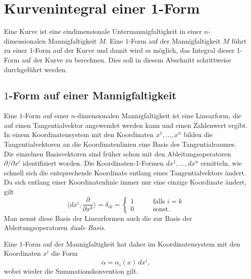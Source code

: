%
%
\section{Kurvenintegral einer 1-Form
\label{buch:kurvenintegral:section:1form}}
%
Eine Kurve ist eine eindimensionale Untermannigfaltigkeit in
einer $n$-dimensionalen Mannigfaltigkeit $M$.
Eine $1$-Form auf der Mannigfaltigkeit $M$ führt zu einer 
$1$-Form auf der Kurve und damit wird es möglich, das Integral
dieser 1-Form auf der Kurve zu berechnen.
Dies soll in diesem Abschnitt schrittweise durchgeführt werden.

%
%
\subsection{$1$-Form auf einer Mannigfaltigkeit}
Eine $1$-Form auf einer $n$-dimensionalen Mannigfaltigkeit ist eine
Linearform, die auf einen Tangentialvektor angewendet werden kann
und einen Zahlenwert ergibt.
In einem Koordinatensystem mit den Koordinaten $x^1,\dots,x^n$ bilden
die Tangentialvektoren an die Koordinatenlinien eine Basis des
Tangentialraumes.
Die einzelnen Basisvektoren sind früher schon mit den
Ableitungsoperatoren $\partial/\partial x^i$ identifiziert worden.
Die Koordinaten-1-Formen $dx^1,\dots,dx^n$ ermitteln, wie schnell sich
die entsprechende Koordinate entlang eines Tangentialvektors ändert.
Da sich entlang einer Koordinatenlinie immer nur eine einzige
Koordinate ändert, gilt
\[
\biggl\langle dx^i,\frac{\partial}{\partial x^k}\biggr\rangle
=
\delta_{ik}
=
\begin{cases}
1&\qquad \text{falls $i=k$}\\
0&\qquad \text{sonst}.
\end{cases}
\]
%
Man nennt diese Basis der Linearformen auch die zur Basis der
Ableitungsoperatoren \emph{duale Basis}.

Eine $1$-Form auf der Mannigfaltigkeit hat daher im Koordinatensystem
mit den Koordinaten $x^i$ die Form
\[
\alpha
=
\alpha_i(x)\, dx^i,
\]
wobei wieder die Summationskonvention gilt.

